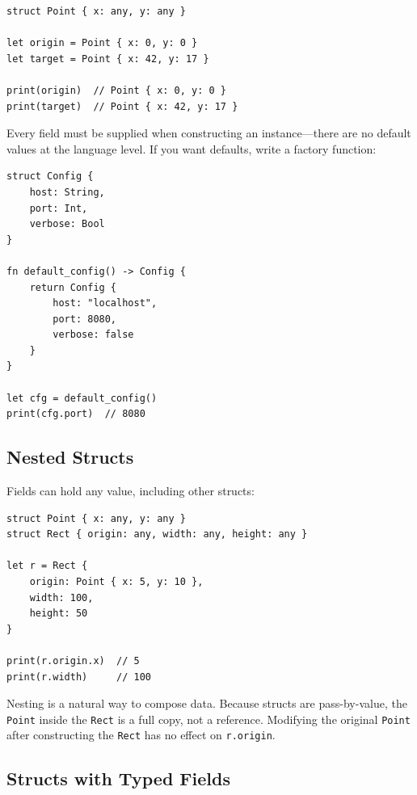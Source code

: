\begin{lstlisting}[language=Lattice, caption={Creating struct instances}]
struct Point { x: any, y: any }

let origin = Point { x: 0, y: 0 }
let target = Point { x: 42, y: 17 }

print(origin)  // Point { x: 0, y: 0 }
print(target)  // Point { x: 42, y: 17 }
\end{lstlisting}

Every field must be supplied when constructing an instance---there are no
default values at the language level. If you want defaults, write a factory
function:

\begin{lstlisting}[language=Lattice, caption={A factory function with defaults}]
struct Config {
    host: String,
    port: Int,
    verbose: Bool
}

fn default_config() -> Config {
    return Config {
        host: "localhost",
        port: 8080,
        verbose: false
    }
}

let cfg = default_config()
print(cfg.port)  // 8080
\end{lstlisting}

\subsection{Nested Structs}

Fields can hold any value, including other structs:

\begin{lstlisting}[language=Lattice, caption={Nested structs}]
struct Point { x: any, y: any }
struct Rect { origin: any, width: any, height: any }

let r = Rect {
    origin: Point { x: 5, y: 10 },
    width: 100,
    height: 50
}

print(r.origin.x)  // 5
print(r.width)     // 100
\end{lstlisting}

Nesting is a natural way to compose data. Because structs are
pass-by-value, the \lstinline|Point| inside the \lstinline|Rect| is a
full copy, not a reference. Modifying the original \lstinline|Point| after
constructing the \lstinline|Rect| has no effect on \lstinline|r.origin|.

\subsection{Structs with Typed Fields}

